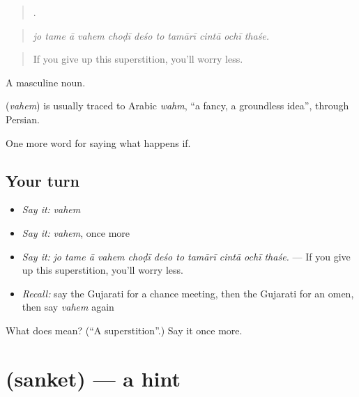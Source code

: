 \begin{quote}
          .
\end{quote}

\begin{quote}
\emph{jo tame ā vahem choḍī deśo to tamārī cintā ochī thaśe.}
\end{quote}

\begin{quote}
If you give up this superstition, you'll worry less.
\end{quote}

A masculine noun.

\begin{cousinweb}
\textbf{} (\emph{vahem}) is usually traced to Arabic \emph{wahm}, \textquotedblleft{}a fancy, a groundless idea\textquotedblright{}, through Persian.
\end{cousinweb}

\begin{grammarlens}[title={What you've built}]
One more word for saying what happens if.
\end{grammarlens}

\subsection*{Your turn}
\begin{itemize}
\raggedright
  \item \emph{Say it:} \emph{vahem}
  \item \emph{Say it:} \emph{vahem}, once more
  \item \emph{Say it:} \emph{jo tame ā vahem choḍī deśo to tamārī cintā ochī thaśe.} — If you give up this superstition, you'll worry less.
  \item \emph{Recall:} say the Gujarati for a chance meeting, then the Gujarati for an omen, then say \emph{vahem} again
\end{itemize}

\begin{tcolorbox}[breakable,colback=teal!4,colframe=teal!35!black,title={Before you move on}]
What does  mean? (\textquotedblleft{}A superstition\textquotedblright{}.) Say it once more.
\end{tcolorbox}
\section[\texorpdfstring{\gu{સંકેત} (sanket)}{સંકેત (sanket)}]{ (sanket) — a hint}


